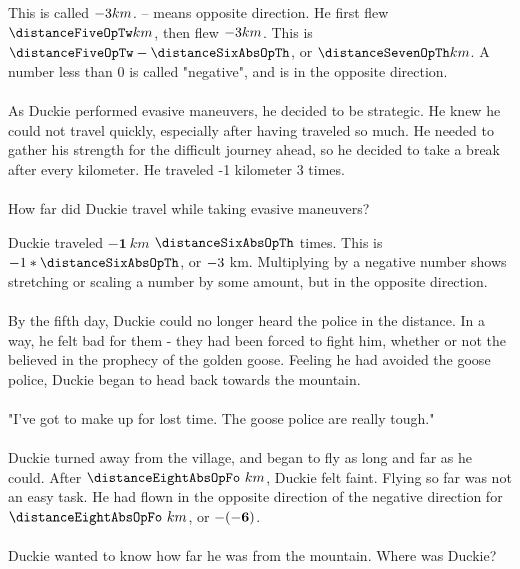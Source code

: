 {This is called $-3 km$. \linebreak – means opposite direction.  He first flew $\distanceFiveOpTw km$, then flew $-3 km$. This is$ \distanceFiveOpTw - \distanceSixAbsOpTh$, or $\distanceSevenOpTh km$.}
{A number less than 0 is called "negative", and is in the opposite direction.}
{}
{\paragraph{} As Duckie performed evasive maneuvers, he decided to be strategic. He knew he could not travel quickly, especially after having traveled so much. He needed to gather his strength for the difficult journey ahead, so he decided to take a break after every kilometer. He traveled -1 kilometer 3 times. 
\paragraph{} How far did Duckie travel while taking evasive maneuvers?}
{Duckie traveled $\mathbf{-1}~km$ $\distanceSixAbsOpTh$ times. This is ${-1}\ast\distanceSixAbsOpTh$, or $-3$ km.}
{Multiplying by a negative number shows stretching or scaling a number by some amount, but in the opposite direction.}
{}
{
	\paragraph{} By the fifth day, Duckie could no longer heard the police in the distance. In a way, he felt bad for them - they had been forced to fight him, whether or not the believed in the prophecy of the golden goose. Feeling he had avoided the goose police, Duckie began to head back towards the mountain. 
	\paragraph{} "I've got to make up for lost time. The goose police are really tough." 
	\paragraph{} Duckie turned away from the village, and began to fly as long and far as he could. After $\distanceEightAbsOpFo~km$, Duckie felt faint. Flying so far was not an easy task. He had flown in the opposite direction of the negative direction for $\distanceEightAbsOpFo~km$, or $\mathbf{-(-6)}$. 
	\paragraph{} Duckie wanted to know how far he was from the mountain. Where was Duckie?
}

